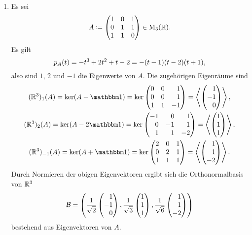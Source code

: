 \begin{example}
  \leavevmode
  \begin{enumerate}
    \item
      Es sei
      \[
                  A
        \coloneqq \begin{pmatrix}
                    1 & 0 & 1 \\
                    0 & 1 & 1 \\
                    1 & 1 & 0
                  \end{pmatrix}
        \in       \operatorname{M}_{3}(\mathbb{R}).
      \]
      Es gilt
      \[
          p_{A}(t)
        = - t^3 + 2 t^2 + t - 2
        = - (t-1)(t-2)(t+1),
      \]
      also sind $1$, $2$ und $-1$ die Eigenwerte von $A$.
      Die zugehörigen Eigenräume sind
      \begin{gather*}
          \eigenspace{(\Real^3)}{A}{1}
        = \ker  (A - \Id)
        = \ker  \begin{pmatrix*}[r]
                  0 & 0 &  1  \\
                  0 & 0 &  1  \\
                  1 & 1 & -1
                \end{pmatrix*}
        = \generated{ \rvect{1 \\ -1 \\ 0} },
      \\
          \eigenspace{(\Real^3)}{A}{2}
        = \ker  (A - 2\Id)
        = \ker  \begin{pmatrix*}[r]
                  -1  &  0  &  1 \\
                   0  & -1  &  1 \\
                   1  &  1  & -2
                \end{pmatrix*}
        = \generated{ \vect{1 \\ 1 \\ 1} },
      \\
          \eigenspace{(\Real^3)}{A}{-1}
        = \ker  (A + \Id)
        = \ker  \begin{pmatrix*}[r]
                  2 & 0 & 1 \\
                  0 & 2 & 1 \\
                  1 & 1 & 1
                \end{pmatrix*}
        = \generated{ \rvect{1 \\ 1 \\ -2} }.
      \end{gather*}
      Durch Normieren der obigen Eigenvektoren ergibt sich die Orthonormalbasis von $\mathbb{R}^3$
      \[
          \basis{B}
        = \left(
            \frac{1}{\sqrt{2}} \rvect{1 \\ -1 \\ 0},
            \frac{1}{\sqrt{3}} \vect{1 \\ 1 \\ 1},
            \frac{1}{\sqrt{6}} \rvect{1 \\ 1 \\ -2}
          \right)
      \]
      bestehend aus Eigenvektoren von $A$.
      

\end{enumerate}
\end{example}
